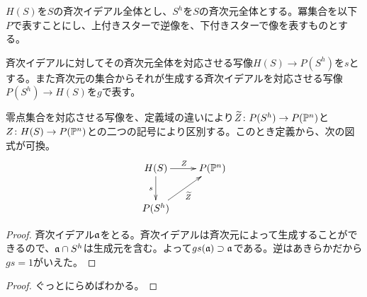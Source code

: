 ﻿
\begin{rem}
  $H(S)$を$S$の斉次イデアル全体とし、$S^h$を$S$の斉次元全体とする。冪集合を以下$P$で表すことにし、上付きスターで逆像を、下付きスターで像を表すものとする。

  斉次イデアルに対してその斉次元全体を対応させる写像$H(S) \to P(S^h)$を$s$とする。また斉次元の集合からそれが生成する斉次イデアルを対応させる写像$P(S^h) \to H(S)$を$g$で表す。

  零点集合を対応させる写像を、定義域の違いにより$\widetilde{Z} \colon P(S^h) \to P(\P^n)$と$Z \colon H(S) \to P(\P^n)$との二つの記号により区別する。このとき定義から、次の図式が可換。
  \[
  \xymatrix{
  H(S) \ar[r]^Z \ar[d]_s & P(\P^n) \\
  P(S^h) \ar[ur]_{\widetilde{Z}}
  }
  \]
\end{rem}


\begin{proof}
  斉次イデアル$\fraka$をとる。斉次イデアルは斉次元によって生成することができるので、$\fraka \cap S^h$は生成元を含む。よって$gs(\fraka) \supset \fraka$である。逆はあきらかだから$gs = 1$がいえた。
\end{proof}
\begin{proof}
  ぐっとにらめばわかる。
\end{proof}

